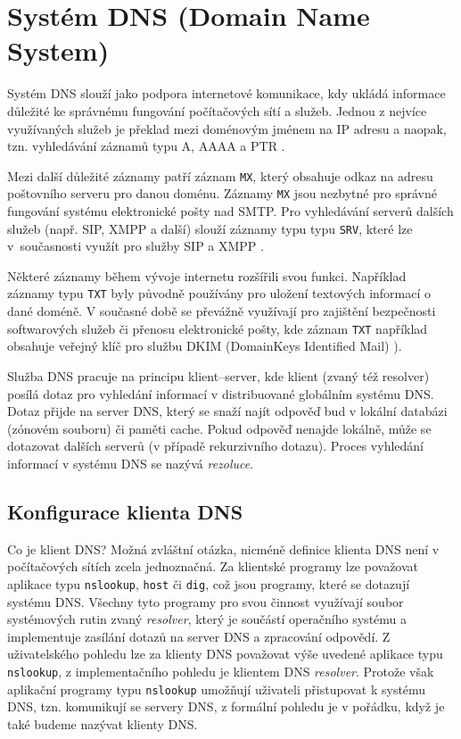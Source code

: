 \section{Systém DNS (Domain Name System)}\label{dns}
Systém DNS slouží jako podpora internetové komunikace, kdy ukládá informace důležité ke správnému fungování počítačových sítí a služeb. Jednou z nejvíce využívaných služeb je překlad mezi doménovým jménem na IP adresu a naopak, tzn. vyhledávání záznamů typu A, AAAA a PTR \cite{rfc1035,rfc3596}.

Mezi další důležité záznamy patří záznam {\tt MX}, který obsahuje odkaz na adresu poštovního serveru pro danou doménu. Záznamy {\tt MX} jsou nezbytné pro správné fungování systému elektronické pošty nad SMTP. Pro vyhledávání serverů dalších služeb (např. SIP, XMPP a další) slouží záznamy typu typu {\tt SRV}, které lze v~současnosti využít pro služby SIP a XMPP \cite{rfc2782}.

Některé záznamy během vývoje internetu rozšířili svou funkci. Například záznamy typu {\tt TXT} byly původně používány pro uložení textových informací o dané doméně. V současné době se převážně využívají pro zajištění bezpečnosti softwarových služeb či přenosu elektronické pošty, kde záznam {\tt TXT} například obsahuje veřejný klíč pro službu DKIM (DomainKeys Identified Mail) \cite{rfc6376}).

Služba DNS pracuje na principu klient--server, kde klient (zvaný též resolver) posílá dotaz pro vyhledání informací v distribuované globálním systému DNS. Dotaz přijde na server DNS, který se snaží najít odpověď bud v lokální databázi (zónovém souboru) či paměti cache. Pokud odpověď nenajde lokálně, může se dotazovat dalších serverů (v případě rekurzivního dotazu). Proces vyhledání informací v systému DNS se nazývá {\em rezoluce}. 

\subsection{Konfigurace klienta DNS}
Co je klient DNS? Možná zvláštní otázka, nicméně definice klienta DNS není v počítačových sítích zcela jednoznačná. Za klientské programy lze považovat aplikace typu {\tt nslookup}, {\tt host} či {\tt dig}, což jsou programy, které se dotazují systému DNS. Všechny tyto programy pro svou činnost využívají soubor systémových rutin zvaný {\em resolver}, který je součástí operačního systému a implementuje zasílání dotazů na server DNS a zpracování odpovědí. Z uživatelského pohledu lze za klienty DNS považovat výše uvedené aplikace typu {\tt nslookup}, z implementačního pohledu je klientem DNS {\em resolver}. Protože však aplikační programy typu {\tt nslookup} umožňují uživateli přistupovat k systému DNS, tzn. komunikují se servery DNS, z formální pohledu je v pořádku, když je také budeme nazývat klienty DNS.

